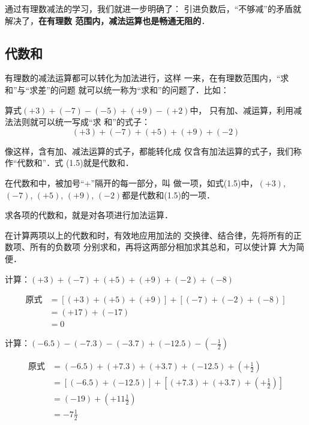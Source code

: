 通过有理数减法的学习，我们就进一步明确了：
引进负数后，“不够减”的矛盾就解决了，\textbf{在有理数
范围内，减法运算也是畅通无阻的}．


\subsection{代数和}
    有理数的减法运算都可以转化为加法进行，这样
一来，在有理数范围内，“求和”与“求差”的问题
就可以统一称为“求和”的问题了．比如：

    算式$(+ 3)+(-7)-(-5)+(+9)-(+2)$中，
只有加、减运算，利用减法法则就可以统一写成“求
和”的式子：
\begin{equation}
    (+ 3)+(-7)+(+5)+(+9)+(-2)
\end{equation}

像这样，含有加、减法运算的式子，都能转化成
仅含有加法运算的式子，我们称作“代数和”．式
  (1.5)就是代数和．

    在代数和中，被加号“+”隔开的每一部分，叫
做一项，如式(1.5)中，$(+3)$, $(-7)$, $(+ 5)$,
  $(+9)$, $(-2)$都是代数和(1.5)的一项．

    求各项的代数和，就是对各项进行加法运算．

    在计算两项以上的代数和时，有效地应用加法的
交换律、结合律，先将所有的正数项、所有的负数项
分别求和，再将这两部分相加求其总和，可以使计算
大为简便．

\begin{example}
计算：$(+3)+(-7)+(+5)+(+9)+(-2)+(-8)$
\end{example}

\begin{solution}
\begin{align*}
    \text{原式}&= [(+3)+(+5)+(+9)]+[(-7)+(-2)+(-8)] \tag{交换、结合律}\\
    &=(+17)+(-17) \tag{同号加法法则}\\
    &=0 \tag{相反数的特性}
\end{align*}
\end{solution}

\begin{example}
    计算：$(-6.5)-(-7.3)-(-3.7)+(-12.5)-\left(-\frac{1}{2}\right)$
\end{example}

\begin{solution}
    \begin{align*}
    \text{原式}&= (-6.5)+(+7.3)+(+3.7)+(-12.5)+\left(+\frac{1}{2}\right) \tag{减法法则}\\
    &=[(-6.5)+(-12.5)]+\left[(+7.3)+(+3.7)+\left(+\frac{1}{2}\right)\right] \tag{交换、结合律}\\
    &=(-19)+\left(+11\frac{1}{2}\right) \tag{同号相加法则}\\
    &=-7\frac{1}{2} \tag{异号相加法则}
\end{align*}
\end{solution}

